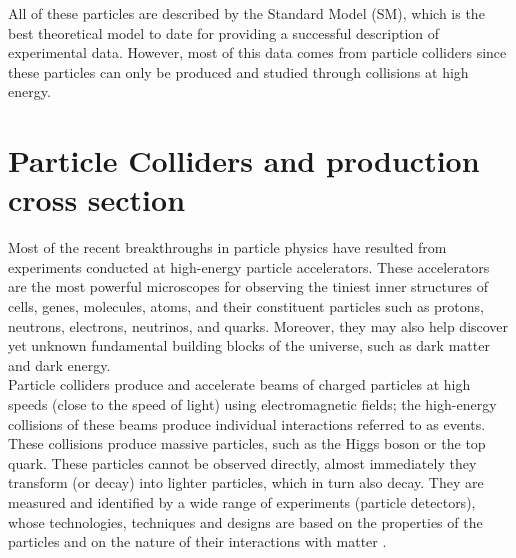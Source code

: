 All of these particles are described by the Standard Model (SM), which is the best theoretical model to date for providing a successful description of experimental data. However, most of this data comes from particle colliders since these particles can only be produced and studied through collisions at high energy.

\section{Particle Colliders and production cross section}

Most of the recent breakthroughs in particle physics have resulted from experiments conducted at high-energy particle accelerators. These accelerators are the most powerful microscopes for observing the tiniest inner structures of cells, genes, molecules, atoms, and their constituent particles such as protons, neutrons, electrons, neutrinos, and quarks. Moreover, they may also help discover yet unknown fundamental building blocks of the universe, such as dark matter and dark energy.\\

Particle colliders produce and accelerate beams of charged particles at high speeds (close to the speed of light) using electromagnetic fields; the high-energy collisions of these beams produce individual interactions referred to as events. These collisions produce massive particles, such as the Higgs boson or the top quark. These particles  cannot be observed directly, almost immediately they transform (or decay) into lighter particles, which in turn also decay. They are measured and identified by a wide range of experiments (particle detectors), whose technologies, techniques and designs are based on the properties of the particles and on the nature of their interactions with matter \cite{thomson_2013}.\\


